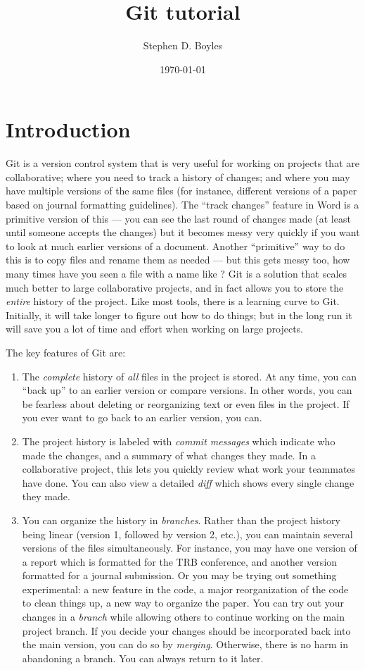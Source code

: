 \documentclass{article}
\title{Git tutorial}
\author{Stephen D. Boyles}
\date{\today}
\begin{document}
\maketitle

\section{Introduction}
\label{sec:introduction}

Git is a version control system that is very useful for working on projects that are collaborative; where you need to track a history of changes; and where you may have multiple versions of the same files (for instance, different versions of a paper based on journal formatting guidelines).
The ``track changes'' feature in Word is a primitive version of this --- you can see the last round of changes made (at least until someone accepts the changes) but it becomes messy very quickly if you want to look at much earlier versions of a document.
Another ``primitive'' way to do this is to copy files and rename them as needed --- but this gets messy too, how many times have you seen a file with a name like ?
Git is a solution that scales much better to large collaborative projects, and in fact allows you to store the \emph{entire} history of the project.
Like most tools, there is a learning curve to Git.
Initially, it will take longer to figure out how to do things; but in the long run it will save you a lot of time and effort when working on large projects.  

The key features of Git are:
\begin{enumerate}
\item The \emph{complete} history of \emph{all} files in the project is stored.
At any time, you can ``back up'' to an earlier version or compare versions.
In other words, you can be fearless about deleting or reorganizing text or even files in the project.
If you ever want to go back to an earlier version, you can.
\item The project history is labeled with \emph{commit messages} which indicate who made the changes, and a summary of what changes they made.
In a collaborative project, this lets you quickly review what work your teammates have done.
You can also view a detailed \emph{diff} which shows every single change they made.
\item You can organize the history in \emph{branches}.
Rather than the project history being linear (version 1, followed by version 2, etc.), you can maintain several versions of the files simultaneously.
For instance, you may have one version of a report which is formatted for the TRB conference, and another version formatted for a journal submission.
Or you may be trying out something experimental: a new feature in the code, a major reorganization of the code to clean things up, a new way to organize the paper.
You can try out your changes in a \emph{branch} while allowing others to continue working on the main project branch.
If you decide your changes should be incorporated back into the main version, you can do so by \emph{merging}.
Otherwise, there is no harm in abandoning a branch.
You can always return to it later.
\end{enumerate}
\end{document}
